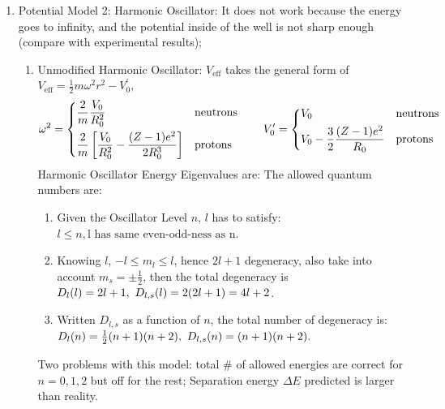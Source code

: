 \documentclass{school-22.101-notes}
\begin{document}
\begin{enumerate}
\item Potential Model 2: Harmonic Oscillator: It does not work because the energy goes to infinity, and the potential inside of the well is not sharp enough (compare with experimental results);
    \begin{enumerate}
    \item Unmodified Harmonic Oscillator: $V_{\mathrm{eff}}$ takes the general form of $V_{\mathrm{eff}} = \frac{1}{2} m \omega^2 r^2 - V_0^{\prime},$ 
        \begin{align}
        \omega^2 =
        \begin{dcases*}
        \frac{2}{m} \frac{V_0}{R_0^2}  & neutrons \\
        \frac{2}{m} \left[ \frac{V_0}{R_0^2} - \frac{(Z-1) e^2}{2 R_0^3} \right] & protons \\
        \end{dcases*}
        \fsp \fsp \fsp \fsp \fsp
        V_0^{\prime} = 
        \begin{dcases*}
        V_0 & neutrons \\
        V_0 - \frac{3}{2} \frac{(Z-1) e^2}{R_0} & protons \\
        \end{dcases*}
        \end{align}
    Harmonic Oscillator Energy Eigenvalues are:
    The allowed quantum numbers are:    
        \begin{enumerate}
            \item Given the Oscillator Level $n$, $l$ has to satisfy: $ l \le n, \mbox{l has same even-odd-ness as n.}$
            \item Knowing $l$, $-l \le m_l \le l$, hence $2l+1$ degeneracy, also take into account $m_s = \pm \frac{1}{2}$, then the total degeneracy is $ D_l (l) = 2l+1, \mbox{ } D_{l,s} (l) = 2(2l+1) = 4l+2$.
            \item Written $D_{l,s}$ as a function of $n$, the total number of degeneracy is: 
            $ D_l (n) = \frac{1}{2} (n+1)(n+2), \mbox{ } D_{l,s} (n) = (n+1)(n+2).$
        \end{enumerate}
    Two problems with this model: total \# of allowed energies are correct for $n=0,1,2$ but off for the rest; Separation energy $\Delta E$ predicted is larger than reality.        
        

\end{enumerate}
\end{enumerate}
\end{document}
